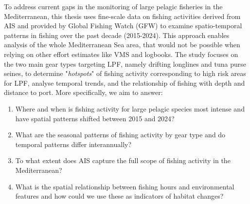 \medskip

To address current gaps in the monitoring of large pelagic fisheries in the Mediterranean, this
thesis uses fine-scale data on fishing activities derived from AIS and provided by Global Fishing
Watch (GFW) to examine spatio-temporal patterns in fishing over the past decade (2015-2024). This
approach enables analysis of the whole Mediterranean Sea area, that would not be possible when
relying on other effort estimates like VMS and logbooks. The study focuses on the two main gear
types targeting LPF, namely drifting longlines and tuna purse seines, to determine
"\textit{hotspots}" of fishing activity corresponding to high risk areas for LPF, analyse temporal
trends, and the relationship of fishing with depth and distance to port. More specifically, we aim
to answer:
\begin{enumerate}
	\item Where and when is fishing activity for large pelagic species most intense and have spatial patterns
	      shifted between 2015 and 2024?
	\item What are the seasonal patterns of fishing activity by gear type and do temporal patterns differ
	      interannually?
	\item To what extent does AIS capture the full scope of fishing activity in the Mediterranean?
	\item What is the spatial relationship between fishing hours and environmental features and how could we
	      use these as indicators of habitat changes?
\end{enumerate}